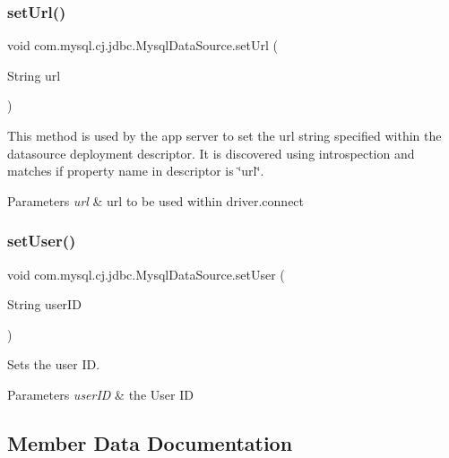 \subsubsection{\texorpdfstring{set\+Url()}{setUrl()}}
{\footnotesize\ttfamily void com.\+mysql.\+cj.\+jdbc.\+Mysql\+Data\+Source.\+set\+Url (\begin{DoxyParamCaption}\item[{String}]{url }\end{DoxyParamCaption})}

This method is used by the app server to set the url string specified within the datasource deployment descriptor. It is discovered using introspection and matches if property name in descriptor is \char`\"{}url\char`\"{}.


\begin{DoxyParams}{Parameters}
{\em url} & url to be used within driver.\+connect \\
\hline
\end{DoxyParams}
\mbox{\label{classcom_1_1mysql_1_1cj_1_1jdbc_1_1_mysql_data_source_a34a8c203cf757fa8e40e88e5af2cff0b}} 
\subsubsection{\texorpdfstring{set\+User()}{setUser()}}
{\footnotesize\ttfamily void com.\+mysql.\+cj.\+jdbc.\+Mysql\+Data\+Source.\+set\+User (\begin{DoxyParamCaption}\item[{String}]{user\+ID }\end{DoxyParamCaption})}

Sets the user ID.


\begin{DoxyParams}{Parameters}
{\em user\+ID} & the User ID \\
\hline
\end{DoxyParams}


\subsection{Member Data Documentation}
\mbox{\label{classcom_1_1mysql_1_1cj_1_1jdbc_1_1_mysql_data_source_a033e1f8834e4452b6875af6824350566}} 
